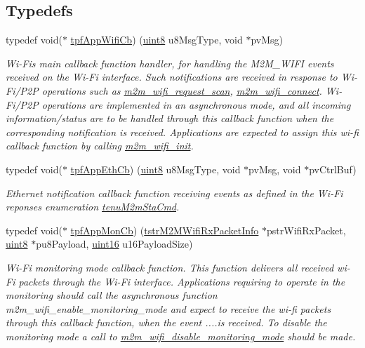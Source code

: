 \subsection*{Typedefs}
\begin{DoxyCompactItemize}
\item 
typedef void($\ast$ \hyperlink{group__WlanEnums_gac5302f32839285fe8375c159087aa8a1}{tpf\+App\+Wifi\+Cb}) (\hyperlink{group__DataT_ga4df709a77647e870bbf1d955b8edc9a6}{uint8} u8\+Msg\+Type, void $\ast$pv\+Msg)
\begin{DoxyCompactList}\small\item\em Wi-\/\+Fi\textquotesingle{}s main callback function handler, for handling the M2\+M\+\_\+\+W\+I\+FI events received on the Wi-\/\+Fi interface. Such notifications are received in response to Wi-\/\+Fi/\+P2P operations such as \hyperlink{group__WifiRequestScanFn_ga499dfa24a19c2e84776aeabedf897135}{m2m\+\_\+wifi\+\_\+request\+\_\+scan}, \hyperlink{group__WifiConnectFn_ga19c9871147efe70f5d9c2cc2cdd5bff0}{m2m\+\_\+wifi\+\_\+connect}. Wi-\/\+Fi/\+P2P operations are implemented in an asynchronous mode, and all incoming information/status are to be handled through this callback function when the corresponding notification is received. Applications are expected to assign this wi-\/fi callback function by calling \hyperlink{group__WifiInitFn_ga73c734812e844d96d860c4e93e9daf35}{m2m\+\_\+wifi\+\_\+init}. \end{DoxyCompactList}\item 
typedef void($\ast$ \hyperlink{group__WlanEnums_ga9dda38bbac67906396ad1b1e0419502d}{tpf\+App\+Eth\+Cb}) (\hyperlink{group__DataT_ga4df709a77647e870bbf1d955b8edc9a6}{uint8} u8\+Msg\+Type, void $\ast$pv\+Msg, void $\ast$pv\+Ctrl\+Buf)
\begin{DoxyCompactList}\small\item\em Ethernet notification callback function receiving events as defined in the Wi-\/\+Fi reponses enumeration \hyperlink{group__WlanEnums_ga064de09dec1d5e88ed8d075fa40f57de}{tenu\+M2m\+Sta\+Cmd}. \end{DoxyCompactList}\item 
typedef void($\ast$ \hyperlink{group__WlanEnums_ga8d2753e870245dad4932cee1777c6eb6}{tpf\+App\+Mon\+Cb}) (\hyperlink{structtstrM2MWifiRxPacketInfo}{tstr\+M2\+M\+Wifi\+Rx\+Packet\+Info} $\ast$pstr\+Wifi\+Rx\+Packet, \hyperlink{group__DataT_ga4df709a77647e870bbf1d955b8edc9a6}{uint8} $\ast$pu8\+Payload, \hyperlink{group__DataT_ga1daa745171fc6e31d942c161422a76f9}{uint16} u16\+Payload\+Size)
\begin{DoxyCompactList}\small\item\em Wi-\/\+Fi monitoring mode callback function. This function delivers all received wi-\/\+Fi packets through the Wi-\/\+Fi interface. Applications requiring to operate in the monitoring should call the asynchronous function m2m\+\_\+wifi\+\_\+enable\+\_\+monitoring\+\_\+mode and expect to receive the wi-\/fi packets through this callback function, when the event ....is received. To disable the monitoring mode a call to \hyperlink{group__WifiDisableMonitorModeFn_ga22d6c3d2f63fceac652835994cb15594}{m2m\+\_\+wifi\+\_\+disable\+\_\+monitoring\+\_\+mode} should be made. \end{DoxyCompactList}\end{DoxyCompactItemize}
